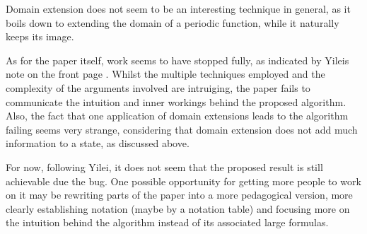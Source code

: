 \documentclass[10pt]{amsart}
\theoremstyle{definition}
\theoremstyle{remark}
\begin{document}
    \phantom{}
    
    Domain extension does not seem to be an interesting technique in general, as it boils down to extending the domain of a periodic function, while it naturally keeps its image.

    \phantom{}

    As for the paper itself, work seems to have stopped fully, as indicated by Yileis note on the front page \cite{Chen2024}. Whilst the multiple techniques employed and the complexity of the arguments involved are intruiging, the paper fails to communicate the intuition and inner workings behind the proposed algorithm. Also, the fact that one application of domain extensions leads to the algorithm failing seems very strange, considering that domain extension does not add much information to a state, as discussed above.

    \phantom{}
    
    For now, following Yilei, it does not seem that the proposed result is still achievable due the bug. One possible opportunity for getting more people to work on it may be rewriting parts of the paper into a more pedagogical version, more clearly establishing notation (maybe by a notation table) and focusing more on the intuition behind the algorithm instead of its associated large formulas.

    \printbibliography{}
\end{document}
